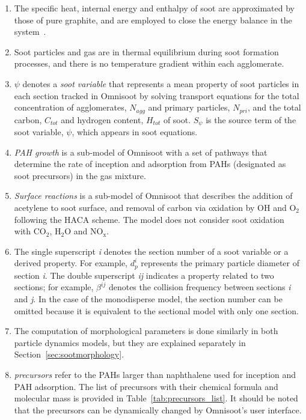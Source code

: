 \begin{enumerate}
	
	\item The specific heat, internal energy and enthalpy of soot are approximated by those of pure graphite, and are employed to close the energy balance in the system~\cite{mcbride1993coefficients}.
	
	\item Soot particles and gas are in thermal equilibrium during soot formation processes, and there is no temperature gradient within each agglomerate.
	
	
	\item $\psi$ denotes a \textit{soot variable} that represents a mean property of soot particles in each section tracked in Omnisoot by solving transport equations for the total concentration of agglomerates, $N_{agg}$ and primary particles, $N_{pri}$, and the total carbon, $C_{tot}$ and hydrogen content, $H_{tot}$ of soot. $S_{\psi}$ is the source term of the soot variable, $\psi$, which appears in soot equations.  
	
	\item \textit{PAH growth} is a sub-model of Omnisoot with a set of pathways that determine the rate of inception and adsorption from PAHs (designated as soot precursors) in the gas mixture.
	
	\item \textit{Surface reactions} is a sub-model of Omnisoot that describes the addition of acetylene to soot surface, and removal of carbon via oxidation by OH and $\mathrm{O_2}$ following the HACA scheme. The model does not consider soot oxidation with $\mathrm{CO_2}$, $\mathrm{H_2O}$ and $\mathrm{NO_x}$.
	
	\item The single superscript \textit{i} denotes the section number of a soot variable or a derived property. For example, $d^i_p$ represents the primary particle diameter of section \textit{i}. The double superscript \textit{ij} indicates a property related to two sections; for example, $\beta^{ij}$ denotes the collision frequency between sections \textit{i} and \textit{j}. In the case of the monodisperse model, the section number can be omitted because it is equivalent to the sectional model with only one section.
	
	
	\item The computation of morphological parameters is done similarly in both particle dynamics models, but they are explained separately in Section~\ref{sec:sootmorphology}.
	
	\item \textit{precursors} refer to the PAHs larger than naphthalene used for inception and PAH adsorption. The list of precursors with their chemical formula and molecular mass is provided in Table~\ref{tab:precursors_list}. It should be noted that the precursors can be dynamically changed by Omnisoot's user interface.
	

\end{enumerate}
